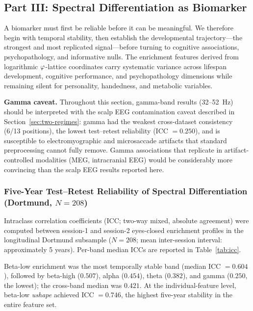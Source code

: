 \subsection{Part III: Spectral Differentiation as Biomarker}
\label{sec:biomarker}

A biomarker must first be reliable before it can be meaningful. We therefore begin with temporal stability, then establish the developmental trajectory---the strongest and most replicated signal---before turning to cognitive associations, psychopathology, and informative nulls. The enrichment features derived from logarithmic $\varphi$-lattice coordinates carry systematic variance across lifespan development, cognitive performance, and psychopathology dimensions while remaining silent for personality, handedness, and metabolic variables.

\textbf{Gamma caveat.} Throughout this section, gamma-band results (32--52~Hz) should be interpreted with the scalp EEG contamination caveat described in Section~\ref{sec:two-regimes}: gamma had the weakest cross-dataset consistency (6/13 positions), the lowest test--retest reliability (ICC $= 0.250$), and is susceptible to electromyographic and microsaccade artifacts that standard preprocessing cannot fully remove. Gamma associations that replicate in artifact-controlled modalities (MEG, intracranial EEG) would be considerably more convincing than the scalp EEG results reported here.

\subsubsection{Five-Year Test--Retest Reliability of Spectral Differentiation (Dortmund, $N = 208$)}
\label{sec:testretest}

Intraclass correlation coefficients (ICC; two-way mixed, absolute agreement) were computed between session-1 and session-2 eyes-closed enrichment profiles in the longitudinal Dortmund subsample ($N = 208$; mean inter-session interval: approximately 5 years). Per-band median ICCs are reported in Table~\ref{tab:icc}.

Beta-low enrichment was the most temporally stable band (median ICC $= 0.604$), followed by beta-high ($0.507$), alpha ($0.454$), theta ($0.382$), and gamma ($0.250$, the lowest); the cross-band median was $0.421$. At the individual-feature level, beta-low \textit{ushape} achieved ICC $= 0.746$, the highest five-year stability in the entire feature set.

